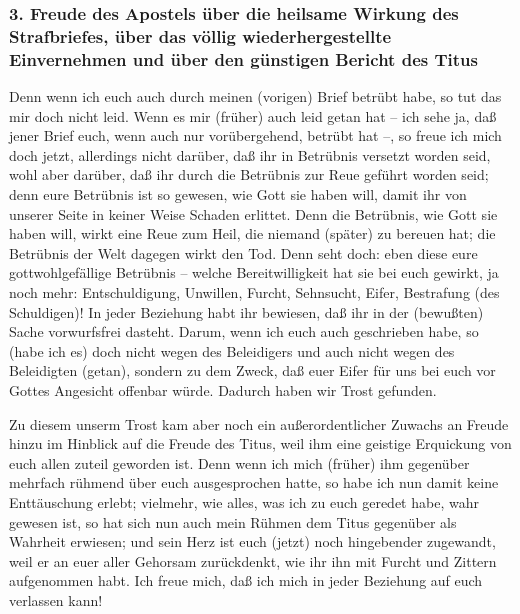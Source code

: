 \hypertarget{freude-des-apostels-uxfcber-die-heilsame-wirkung-des-strafbriefes-uxfcber-das-vuxf6llig-wiederhergestellte-einvernehmen-und-uxfcber-den-guxfcnstigen-bericht-des-titus}{%
\subsubsection{3. Freude des Apostels über die heilsame Wirkung des
Strafbriefes, über das völlig wiederhergestellte Einvernehmen und über
den günstigen Bericht des
Titus}\label{freude-des-apostels-uxfcber-die-heilsame-wirkung-des-strafbriefes-uxfcber-das-vuxf6llig-wiederhergestellte-einvernehmen-und-uxfcber-den-guxfcnstigen-bericht-des-titus}}

 Denn wenn ich euch auch durch meinen (vorigen) Brief
betrübt habe, so tut das mir doch nicht leid. Wenn es mir (früher) auch
leid getan hat -- ich sehe ja, daß jener Brief euch, wenn auch nur
vorübergehend, betrübt hat --,  so freue ich mich doch
jetzt, allerdings nicht darüber, daß ihr in Betrübnis versetzt worden
seid, wohl aber darüber, daß ihr durch die Betrübnis zur Reue geführt
worden seid; denn eure Betrübnis ist so gewesen, wie Gott sie haben
will, damit ihr von unserer Seite in keiner Weise Schaden erlittet.
 Denn die Betrübnis, wie Gott sie haben will, wirkt eine
Reue zum Heil, die niemand (später) zu bereuen hat; die Betrübnis der
Welt dagegen wirkt den Tod.  Denn seht doch: eben diese
eure gottwohlgefällige Betrübnis -- welche Bereitwilligkeit hat sie bei
euch gewirkt, ja noch mehr: Entschuldigung, Unwillen, Furcht, Sehnsucht,
Eifer, Bestrafung (des Schuldigen)! In jeder Beziehung habt ihr
bewiesen, daß ihr in der (bewußten) Sache vorwurfsfrei dasteht.
 Darum, wenn ich euch auch geschrieben habe, so (habe ich
es) doch nicht wegen des Beleidigers und auch nicht wegen des
Beleidigten (getan), sondern zu dem Zweck, daß euer Eifer für uns bei
euch vor Gottes Angesicht offenbar würde. Dadurch haben wir Trost
gefunden.

 Zu diesem unserm Trost kam aber noch ein
außerordentlicher Zuwachs an Freude hinzu im Hinblick auf die Freude des
Titus, weil ihm eine geistige Erquickung von euch allen zuteil geworden
ist.  Denn wenn ich mich (früher) ihm gegenüber mehrfach
rühmend über euch ausgesprochen hatte, so habe ich nun damit keine
Enttäuschung erlebt; vielmehr, wie alles, was ich zu euch geredet habe,
wahr gewesen ist, so hat sich nun auch mein Rühmen dem Titus gegenüber
als Wahrheit erwiesen;  und sein Herz ist euch (jetzt)
noch hingebender zugewandt, weil er an euer aller Gehorsam zurückdenkt,
wie ihr ihn mit Furcht und Zittern aufgenommen habt.  Ich
freue mich, daß ich mich in jeder Beziehung auf euch verlassen kann!

